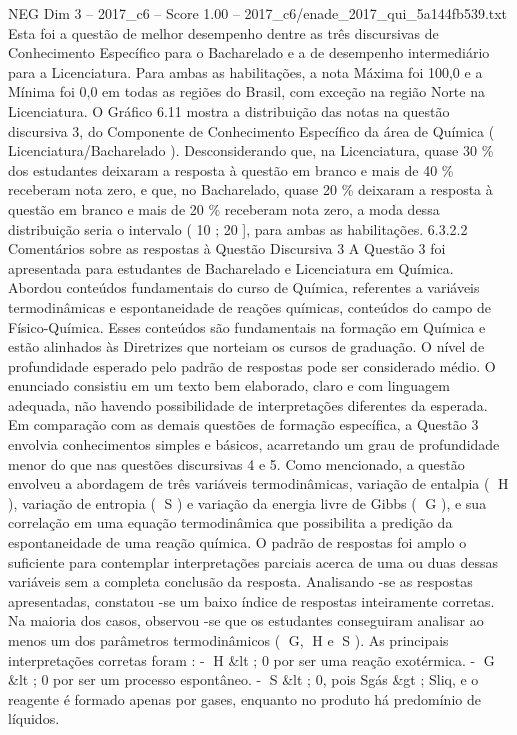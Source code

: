 \begin{textsample}{NEG Dim 3 – 2017\_c6 – Score 1.00 – 2017\_c6/enade\_2017\_qui\_5a144fb539.txt}
Esta foi a questão de melhor desempenho dentre as três discursivas de Conhecimento Específico para o Bacharelado e a de desempenho intermediário para a Licenciatura.
Para ambas as habilitações, a nota Máxima foi 100,0 e a Mínima foi 0,0 em todas as regiões do Brasil, com exceção na região Norte na Licenciatura.
O Gráfico 6.11 mostra a distribuição das notas na questão discursiva 3, do Componente de Conhecimento Específico da área de Química ( Licenciatura/Bacharelado ).
Desconsiderando que, na Licenciatura, quase 30 \% dos estudantes deixaram a resposta à questão em branco e mais de 40 \% receberam nota zero, e que, no Bacharelado, quase 20 \% deixaram a resposta à questão em branco e mais de 20 \% receberam nota zero, a moda dessa distribuição seria o intervalo ( 10 ; 20 ], para ambas as habilitações. 6.3.2.2 Comentários sobre as respostas à Questão Discursiva 3 A Questão 3 foi apresentada para estudantes de Bacharelado e Licenciatura em Química.
Abordou conteúdos fundamentais do curso de Química, referentes a variáveis termodinâmicas e espontaneidade de reações químicas, conteúdos do campo de Físico-Química.
Esses conteúdos são fundamentais na formação em Química e estão alinhados às Diretrizes que norteiam os cursos de graduação.
O nível de profundidade esperado pelo padrão de respostas pode ser considerado médio.
O enunciado consistiu em um texto bem elaborado, claro e com linguagem adequada, não havendo possibilidade de interpretações diferentes da esperada.
Em comparação com as demais questões de formação específica, a Questão 3 envolvia conhecimentos simples e básicos, acarretando um grau de profundidade menor do que nas questões discursivas 4 e 5.
Como mencionado, a questão envolveu a abordagem de três variáveis termodinâmicas, variação de entalpia ( H ), variação de entropia ( S ) e variação da energia livre de Gibbs ( G ), e sua correlação em uma equação termodinâmica que possibilita a predição da espontaneidade de uma reação química.
O padrão de respostas foi amplo o suficiente para contemplar interpretações parciais acerca de uma ou duas dessas variáveis sem a completa conclusão da resposta.
Analisando -se as respostas apresentadas, constatou -se um baixo índice de respostas inteiramente corretas.
Na maioria dos casos, observou -se que os estudantes conseguiram analisar ao menos um dos parâmetros termodinâmicos ( G, H e S ).
As principais interpretações corretas foram : - H \&lt ; 0 por ser uma reação exotérmica. - G \&lt ; 0 por ser um processo espontâneo. - S \&lt ; 0, pois Sgás \&gt ; Sliq, e o reagente é formado apenas por gases, enquanto no produto há predomínio de líquidos.

\end{textsample}
